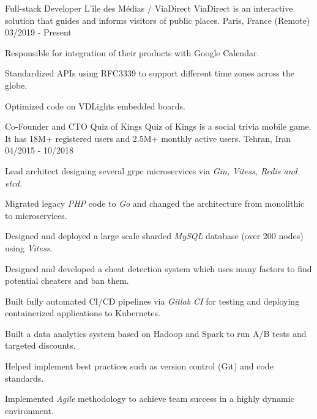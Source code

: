 
\begin{cventries}

  \cventry
    {Full-stack Developer} %
    {L'île des Médias / ViaDirect} %
    {ViaDirect is an interactive solution that guides and informs visitors of public places.}
    {Paris, France (Remote)} %
    {03/2019 - Present} %
    {
      \begin{cvitems}
        \item{Responsible for integration of their products with Google Calendar.}
        \item{Standardized APIs using RFC3339 to support different time zones across the globe.}
        \item{Optimized code on VDLights embedded boards.}
      \end{cvitems}
    }

  \cventry
    {Co-Founder and CTO} %
    {Quiz of Kings} %
    {Quiz of Kings is a social trivia mobile game. It has 18M+ registered users and 2.5M+ monthly active users.}
    {Tehran, Iran} %
    {04/2015 - 10/2018} %
    {
      \begin{cvitems} %
        \item {Lead architect designing several grpc microservices via \emph{Gin, Vitess, Redis and etcd.}}
        \item {Migrated legacy \emph{PHP} code to \emph{Go} and changed the architecture from monolithic to microservices.}
        \item {Designed and deployed a large scale sharded \emph{MySQL} database (over 200 nodes) using \emph{Vitess}.}
        \item {Designed and developed a cheat detection system which uses many factors to find potential cheaters and ban them.}
        \item {Built fully automated CI/CD pipelines via \emph{Gitlab CI} for testing and deploying containerized applications to Kubernetes.}
        \item {Built a data analytics system based on Hadoop and Spark to run A/B tests and targeted discounts.}
        \item {Helped implement best practices such as version control (Git) and code standards.}
        \item {Implemented \emph{Agile} methodology to achieve team success in a highly dynamic environment.}
      \end{cvitems}
    }


\end{cventries}
